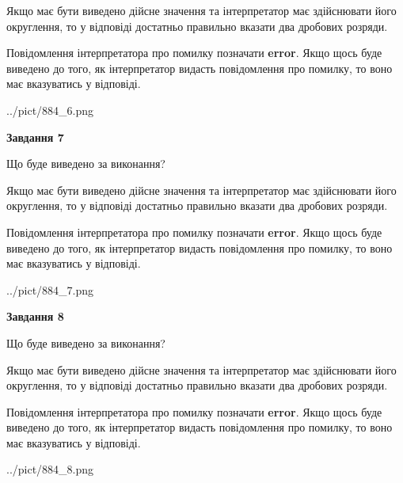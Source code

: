 \documentclass[12pt, ukrainian]{article}
\begin{document}
{\begin {Large}
Якщо має бути виведено дійсне значення та інтерпретатор має здійснювати його округлення, 
то у відповіді достатньо правильно вказати два дробових розряди.

Повідомлення інтерпретатора про помилку позначати \textbf{error}.
Якщо щось буде виведено до того, як інтерпретатор видасть повідомлення про помилку, 
то воно має вказуватись у відповіді. \par

\begin{center}
	{../pict/884_6.png}
\end{center}
\newpage

{\begin {center}\textbf{Завдання 7}\end {center}}\par
Що буде виведено за виконання? \par

Якщо має бути виведено дійсне значення та інтерпретатор має здійснювати його округлення, 
то у відповіді достатньо правильно вказати два дробових розряди.

Повідомлення інтерпретатора про помилку позначати \textbf{error}.
Якщо щось буде виведено до того, як інтерпретатор видасть повідомлення про помилку, 
то воно має вказуватись у відповіді. \par

\begin{center}
	{../pict/884_7.png}
\end{center}
\newpage

{\begin {center}\textbf{Завдання 8}\end {center}}\par
Що буде виведено за виконання? \par

Якщо має бути виведено дійсне значення та інтерпретатор має здійснювати його округлення, 
то у відповіді достатньо правильно вказати два дробових розряди.

Повідомлення інтерпретатора про помилку позначати \textbf{error}.
Якщо щось буде виведено до того, як інтерпретатор видасть повідомлення про помилку, 
то воно має вказуватись у відповіді. \par

\begin{center}
	{../pict/884_8.png}
\end{center}
\newpage


\end{Large}}
\end{document}
